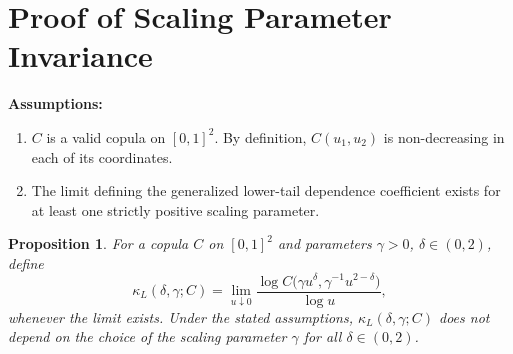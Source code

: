 \documentclass{article}
\newtheorem{proposition}{Proposition}
\begin{document}
\section*{Proof of Scaling Parameter Invariance}

\textbf{Assumptions:}
\begin{enumerate}
    \item $C$ is a valid copula on $[0,1]^2$. By definition, $C(u_1, u_2)$ is non-decreasing in each of its coordinates.
    \item The limit defining the generalized lower-tail dependence coefficient exists for at least one strictly positive scaling parameter.
\end{enumerate}

\begin{proposition}
For a copula $C$ on $[0,1]^2$ and parameters $\gamma>0$, $\delta\in(0,2)$, define
\[
\kappa_L(\delta,\gamma;C) = \lim_{u\downarrow 0} \frac{\log C\!\bigl(\gamma u^\delta,\gamma^{-1}u^{2-\delta}\bigr)}{\log u},
\]
whenever the limit exists. Under the stated assumptions, $\kappa_L(\delta,\gamma;C)$ does not depend on the choice of the scaling parameter $\gamma$ for all $\delta \in (0,2)$.
\end{proposition}
\end{document}
